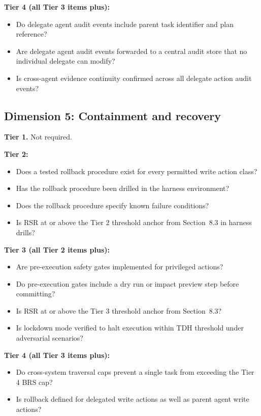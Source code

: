 \documentclass[11pt]{article}
\begin{document}
\textbf{Tier 4 (all Tier 3 items plus):}
\begin{itemize}
  \item Do delegate agent audit events include parent task identifier and plan reference?
  \item Are delegate agent audit events forwarded to a central audit store that no individual delegate can modify?
  \item Is cross-agent evidence continuity confirmed across all delegate action audit events?
\end{itemize}

\subsection{Dimension 5: Containment and recovery}

\textbf{Tier 1.} Not required.

\textbf{Tier 2:}
\begin{itemize}
  \item Does a tested rollback procedure exist for every permitted write action class?
  \item Has the rollback procedure been drilled in the harness environment?
  \item Does the rollback procedure specify known failure conditions?
  \item Is RSR at or above the Tier 2 threshold anchor from Section~8.3 in harness drills?
\end{itemize}

\textbf{Tier 3 (all Tier 2 items plus):}
\begin{itemize}
  \item Are pre-execution safety gates implemented for privileged actions?
  \item Do pre-execution gates include a dry run or impact preview step before committing?
  \item Is RSR at or above the Tier 3 threshold anchor from Section~8.3?
  \item Is lockdown mode verified to halt execution within TDH threshold under adversarial scenarios?
\end{itemize}

\textbf{Tier 4 (all Tier 3 items plus):}
\begin{itemize}
  \item Do cross-system traversal caps prevent a single task from exceeding the Tier 4 BRS cap?
  \item Is rollback defined for delegated write actions as well as parent agent write actions?
\end{itemize}
\end{document}
